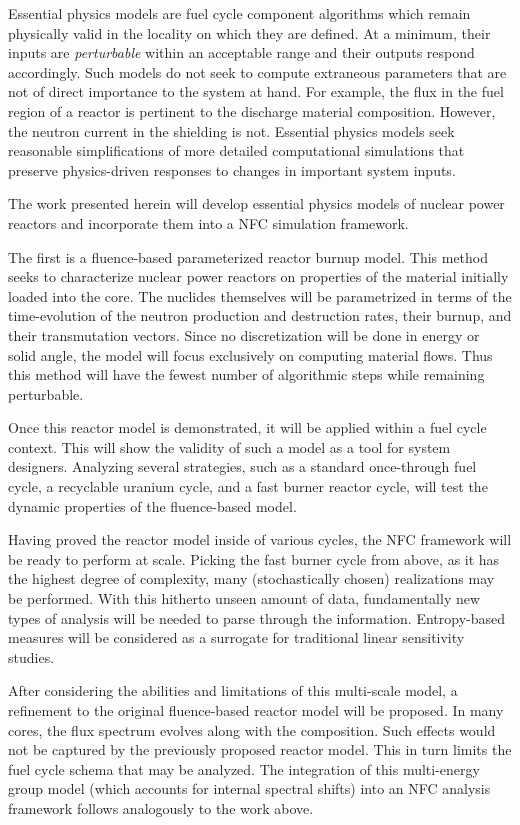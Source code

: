 Essential physics models are fuel cycle component algorithms which remain physically valid in the 
locality on which they are defined.  At a minimum, their inputs are \emph{perturbable} 
within an acceptable range and their outputs respond accordingly.  Such 
models do not seek to compute extraneous parameters that are not of direct importance
to the system at hand.  For example, the flux in the fuel region of a reactor is 
pertinent to the discharge material composition.  However, the neutron current in the 
shielding is not. 
Essential physics models seek reasonable simplifications of more detailed computational 
simulations that preserve physics-driven responses to changes in important system 
inputs.

The work presented herein will develop essential physics models of nuclear power reactors
and incorporate them into a NFC simulation framework.

The first is a fluence-based parameterized reactor burnup model.  
This method seeks to characterize nuclear power
reactors on properties of the material initially loaded into the core.  The nuclides
themselves will be parametrized in terms of the time-evolution of the neutron production 
and destruction rates, their burnup, and their transmutation vectors.  Since no discretization
will be done in energy or solid angle, the model will focus exclusively on computing 
material flows.  Thus this method will have the fewest number of algorithmic steps while 
remaining perturbable. 

Once this reactor model is demonstrated, it will be applied within a fuel
cycle context.  This will show the validity of such a model as a tool for system designers.
Analyzing several strategies, such as a standard once-through fuel cycle, a recyclable uranium
cycle, and a fast burner reactor cycle, will test the dynamic properties of the fluence-based
model.  

Having proved the reactor model inside of various cycles, the NFC framework will be ready to 
perform at scale.  Picking the fast burner cycle from above, as it has the highest degree of complexity, 
many (stochastically chosen) realizations may be performed.  With this hitherto unseen amount of data, 
fundamentally new types of analysis will be needed to parse through the information.  Entropy-based measures
will be considered as a surrogate for traditional linear sensitivity studies.

After considering the abilities and limitations of this multi-scale model, a refinement to 
the original fluence-based reactor model will be proposed.  In many cores, the flux spectrum
evolves along with the composition.  Such effects would not be captured by the previously 
proposed reactor model.  This in turn limits the fuel cycle schema that may be analyzed.
The integration of this multi-energy group model (which 
accounts for internal spectral shifts) into an NFC analysis framework follows
analogously to the work above.

